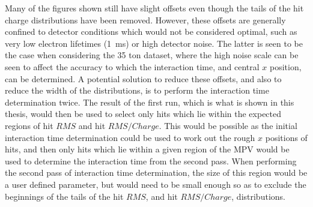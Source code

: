 Many of the figures shown still have slight offsets even though the tails of the hit charge distributions have been removed. However, these offsets are generally confined to detector conditions which would not be considered optimal, such as very low electron lifetimes (1~ms) or high detector noise. The latter is seen to be the case when considering the 35 ton dataset, where the high noise scale can be seen to affect the accuracy to which the interaction time, and central $x$ position, can be determined. A potential solution to reduce these offsets, and also to reduce the width of the distributions, is to perform the interaction time determination twice. The result of the first run, which is what is shown in this thesis, would then be used to select only hits which lie within the expected regions of hit $RMS$ and hit $RMS/Charge$. This would be possible as the initial interaction time determination could be used to work out the rough $x$ positions of hits, and then only hits which lie within a given region of the MPV would be used to determine the interaction time from the second pass. When performing the second pass of interaction time determination, the size of this region would be a user defined parameter, but would need to be small enough so as to exclude the beginnings of the tails of the hit $RMS$, and hit $RMS/Charge$, distributions. \\


